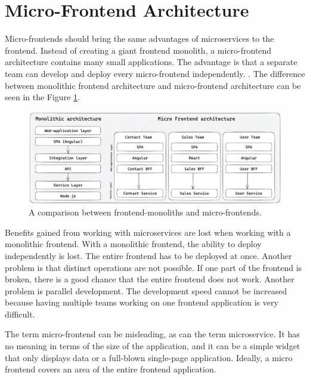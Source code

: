 \section{Micro-Frontend Architecture}\label{section:background:micro-frontend-architecture}

Micro-frontends should bring the same advantages of microservices to the frontend. Instead of creating a giant frontend monolith, a micro-frontend architecture contains many small applications. The advantage is that a separate team can develop and deploy every micro-frontend independently. \cite{book:2020:geers:background:micro-frontends:micro-frontends-in-action}. The difference between monolithic frontend architecture and micro-frontend architecture can be seen in the Figure \ref{fig:background:micro-frontend:monolith-micro-frontend-comparison}.

\ifshowImages
\begin{figure}[H]
    \centering
    \includegraphics[width=1\linewidth]{images/background/micro-frontends/monolith-micro-frontends-comparison.jpg}
    \caption{A comparison between frontend-monoliths and micro-frontends.}\label{fig:background:micro-frontend:monolith-micro-frontend-comparison}
\end{figure}
\fi

\noindent Benefits gained from working with microservices are lost when working with a monolithic frontend. With a monolithic frontend, the ability to deploy independently is lost. The entire frontend has to be deployed at once. Another problem is that distinct operations are not possible. If one part of the frontend is broken, there is a good chance that the entire frontend does not work. Another problem is parallel development. The development speed cannot be increased because having multiple teams working on one frontend application is very difficult. \cite{misc:2019:leitner:background:micro-frontends:micro-frontends-basics}

\bigskip

\noindent The term micro-frontend can be misleading, as can the term microservice. It has no meaning in terms of the size of the application, and it can be a simple widget that only displays data or a full-blown single-page application. Ideally, a micro frontend covers an area of the entire frontend application.

